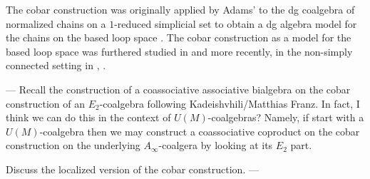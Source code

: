 The cobar construction was originally applied by Adams' to the dg coalgebra of normalized chains on a $1$-reduced simplicial set to obtain a dg algebra model for the chains on the based loop space \cite{Adams}. The cobar construction as a model for the based loop space was furthered studied in \cite{Baues} and more recently, in the non-simply connected setting in \cite{Hess-Tonks}, \cite{Rivera-Zeinalian}.


--- Recall the construction of a coassociative associative bialgebra on the cobar construction of an $E_2$-coalgebra following Kadeishvhili/Matthias Franz. In fact, I think we can do this in the context of $U(M)$-coalgebras? Namely, if start with a $U(M)$-coalgebra then we may construct a coassociative coproduct on the cobar construction on the underlying $A_{\infty}$-coalgera by looking at its $E_2$ part.

Discuss the localized version of the cobar construction. ---